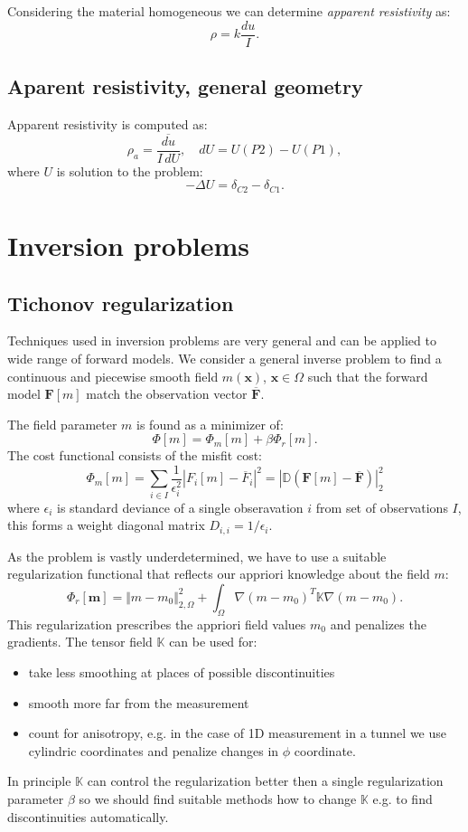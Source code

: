 \documentclass[a4paper, 12pt]{book}
\theoremstyle{definition}
\def\Lapl{\Delta}
\def\grad{\nabla}
\def\vc#1{\mathbf{\boldsymbol{#1}}}     %
\def\tn#1{{\mathbb{#1}}}    %
\def\norm#1{\bigl\Vert#1\bigr\Vert} %
\begin{document}
Considering the material homogeneous we can determine \emph{apparent resistivity} as:
\[
    \rho = k\frac{du}{I}.
\]

\subsection{Aparent resistivity, general geometry}
Apparent resistivity is computed as:
\[
    \rho_a = \frac{\overline{du}}{I\, dU}, \quad dU = U(P2) - U(P1), 
\]
where $U$ is solution to the problem:
\[
   -\Lapl U = \delta_{C2} - \delta_{C1}.
\]




\section{Inversion problems}


\subsection{Tichonov regularization}
Techniques used in inversion problems are very general and can be applied to wide range of forward models. We consider a general inverse problem
to find a continuous and piecewise smooth field $m(\vc x)$, $\vc x\in \Omega$ such that the forward model $\vc F[m]$ match the observation vector $\overline{\vc F}$.

The field parameter $m$ is found  as a minimizer of:
\[
    \Phi[m] = \Phi_m[m] + \beta\Phi_r[m].
\]
The cost functional consists of the misfit cost:
\[
    \Phi_m[m] = \sum_{i\in I} \frac{1}{\epsilon_i^2} |F_i[m] - \overline{F}_i|^2 = |\tn D (\vc F[m] - \overline{\vc F})|_2^2
\]
where $\epsilon_i$ is standard deviance of a single obseravation $i$ from set of observations $I$, this forms a weight diagonal matrix $D_{i,i} = 1/\epsilon_i$. 

As the problem is vastly underdetermined, we have to use a suitable regularization functional that reflects our appriori knowledge about the field $m$:
\[
    \Phi_r[\vc m] = \norm{ m - m_0}_{2,\Omega}^2 + \int_\Omega \grad (m - m_0)^T \tn K \grad (m - m_0).
\]
This regularization prescribes the appriori field values $m_0$ and penalizes the gradients. The tensor field $\tn K$ can be used for:
\begin{itemize}
 \item take less smoothing at places of possible discontinuities
 \item smooth more far from the measurement
 \item count for anisotropy, e.g. in the case of 1D measurement in a tunnel we use cylindric coordinates and 
 penalize changes in $\phi$ coordinate.
\end{itemize}
In principle $\tn K$ can control the regularization better then a single regularization parameter $\beta$ so we should 
find suitable methods how to change $\tn K$ e.g. to find discontinuities automatically.
\end{document}
